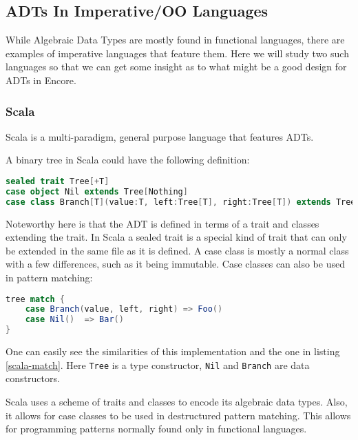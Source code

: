 \documentclass[10pt]{report}
\def\code#1{\texttt{#1}} %
\begin{document}
\subsection{ADTs In Imperative/OO Languages}
\par{While Algebraic Data Types are mostly found in functional languages, there are examples of imperative languages that feature them. Here we will study two such languages so that we can get some insight as to what might be a good design for ADTs in Encore.}
\subsubsection{Scala}
\par{Scala is a multi-paradigm, general purpose language that features ADTs.}
\par{A binary tree in Scala could have the following definition:}

\begin{lstlisting}[language=Scala,caption={ADT definition in Scala},label={lst:e4c_syntax}]
sealed trait Tree[+T]
case object Nil extends Tree[Nothing]
case class Branch[T](value:T, left:Tree[T], right:Tree[T]) extends Tree[T]
\end{lstlisting}
\par{Noteworthy here is that the ADT is defined in terms of a trait and classes extending the trait. In Scala a sealed trait is a special kind of trait that can only be extended in the same file as it is defined. A case class is mostly a normal class with a few differences, such as it being immutable\cite{ScalaCase}. Case classes can also be used in pattern matching:}
\begin{lstlisting}[language=Scala,caption={Pattern matching on an ADT in Scala},label=scala-match]
tree match {
    case Branch(value, left, right) => Foo()
    case Nil()  => Bar()
}
\end{lstlisting}
\par{One can easily see the similarities of this implementation and the one in listing \ref{scala-match}. Here \code{Tree} is a type constructor, \code{Nil} and \code{Branch} are data constructors.}
\par{Scala uses a scheme of traits and classes to encode its algebraic data types. Also, it allows for case classes to be used in destructured pattern matching. This allows for programming patterns normally found only in functional languages.}
\end{document}
